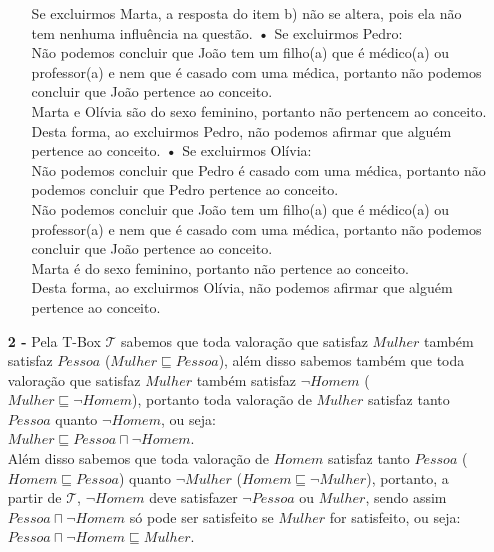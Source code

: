 \documentclass[12pt]{article}
\begin{document}
\begin{itemize}
\begin{itemize}
					Se excluirmos Marta, a resposta do item b) não se altera, pois ela não tem
					nenhuma influência na questão.
					\newline
					\subitem\textbf{•}
					Se excluirmos Pedro:\\
					Não podemos concluir que João tem um filho(a) que é médico(a) ou
					professor(a) e nem que é casado com uma médica, portanto não podemos concluir que João
					pertence ao conceito.\\
					Marta e Olívia são do sexo feminino, portanto não pertencem ao conceito.\\
					Desta forma, ao excluirmos Pedro, não podemos afirmar que alguém pertence ao
					conceito.
					\newline
					\subitem\textbf{•}
					Se excluirmos Olívia:\\
					Não podemos concluir que Pedro é casado com uma médica, portanto não podemos concluir que 
					Pedro pertence ao conceito.\\
					Não podemos concluir que João tem um filho(a) que é médico(a) ou
					professor(a) e nem que é casado com uma médica, portanto não podemos concluir que João
					pertence ao conceito.\\
					Marta é do sexo feminino, portanto não pertence ao conceito.\\
					Desta forma, ao excluirmos Olívia, não podemos afirmar que alguém pertence ao
					conceito.
			\end{itemize}
		\newpage
		\item[\textbf{2 -}]
			\hfill\newline
			Pela T-Box $\mathcal{T}$ sabemos que toda valoração que satisfaz $Mulher$ também satisfaz
			$Pessoa$ ($Mulher \sqsubseteq Pessoa$), além disso sabemos também que toda valoração
			que satisfaz $Mulher$ também satisfaz $\neg Homem$ ($Mulher \sqsubseteq \neg Homem$),
			portanto toda valoração de $Mulher$ satisfaz tanto $Pessoa$ quanto $\neg Homem$, ou seja:\\ 
			$Mulher \sqsubseteq Pessoa \sqcap \neg Homem$.\\
			
			Além disso sabemos que toda valoração de $Homem$ satisfaz tanto $Pessoa$ 
			($Homem \sqsubseteq Pessoa$) quanto $\neg Mulher$ ($Homem \sqsubseteq \neg Mulher$),
			portanto, a partir de $\mathcal{T}$, $\neg Homem$ deve satisfazer $\neg Pessoa$ ou
			$Mulher$, sendo assim $Pessoa \sqcap \neg Homem$ só pode ser satisfeito se $Mulher$
			for satisfeito, ou seja:\\
			$Pessoa \sqcap \neg Homem \sqsubseteq Mulher$.\\
			

\end{itemize}
\end{document}
